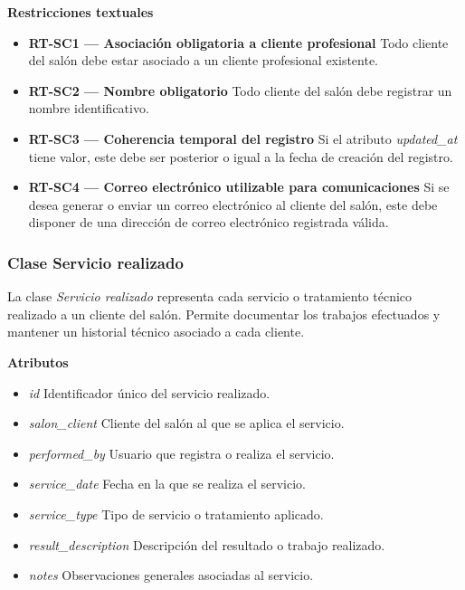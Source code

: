\textbf{Restricciones textuales}

\begin{itemize}

      \item \textbf{RT-SC1 — Asociación obligatoria a cliente profesional}
            Todo cliente del salón debe estar asociado a un cliente profesional existente.
      \item \textbf{RT-SC2 — Nombre obligatorio}
            Todo cliente del salón debe registrar un nombre identificativo.
      \item \textbf{RT-SC3 — Coherencia temporal del registro}
            Si el atributo \textit{updated\_at} tiene valor, este debe ser posterior o igual a la fecha de creación del registro.
      \item \textbf{RT-SC4 — Correo electrónico utilizable para comunicaciones}
            Si se desea generar o enviar un correo electrónico al cliente del salón, este debe disponer de una dirección de correo electrónico registrada válida.
\end{itemize}

\subsubsection{Clase Servicio realizado}

La clase \textit{Servicio realizado} representa cada servicio o tratamiento técnico realizado a un cliente del salón. Permite documentar los trabajos efectuados y mantener un historial técnico asociado a cada cliente.

\textbf{Atributos}

\begin{itemize}

      \item \textit{id}
            Identificador único del servicio realizado.
      \item \textit{salon\_client}
            Cliente del salón al que se aplica el servicio.
      \item \textit{performed\_by}
            Usuario que registra o realiza el servicio.
      \item \textit{service\_date}
            Fecha en la que se realiza el servicio.
      \item \textit{service\_type}
            Tipo de servicio o tratamiento aplicado.
      \item \textit{result\_description}
            Descripción del resultado o trabajo realizado.
      \item \textit{notes}
            Observaciones generales asociadas al servicio.

\end{itemize}

